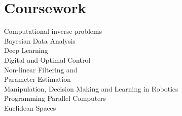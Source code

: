 \documentclass[]{deedy-resume}
\begin{document}
\begin{minipage}[t]{0.33\textwidth}
\section{Coursework}
\textbullet{} Computational inverse problems \\
\textbullet{} Bayesian Data Analysis \\
\textbullet{} Deep Learning \\
\textbullet{} Digital and Optimal Control \\
\textbullet{} Non-linear Filtering and \\ Parameter Estimation \\
\textbullet{} Manipulation, Decision Making and Learning in Robotics \\
\textbullet{} Programming Parallel Computers  \\
\textbullet{} Euclidean Spaces \\
\sectionsep



%
%

\end{minipage} 
\hfill
\end{document}
